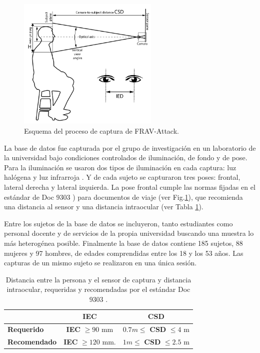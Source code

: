 \begin{figure}[ht]
     \centering
     \includegraphics[width=0.6\textwidth]{ch-sistemasABC/images/ch-BBDDs/CAPTURA_ESTATICA.png}
     \caption{Esquema del proceso de captura de \Gls{FRAV-Attack}.}
     \label{fig:EsquemaCapturaFRAVAttack}
\end{figure}

La base de datos fue capturada por el grupo de investigación  en un laboratorio de la universidad  bajo condiciones controlados de iluminación, de fondo y de pose. Para la iluminación se usaron dos tipos de iluminación en cada captura: luz halógena y luz infrarroja . Y de cada sujeto se capturaron tres poses: frontal, lateral derecha y lateral izquierda. La pose frontal cumple las normas fijadas en el estándar de  Doc $9303$ \cite{doc20069303}) para documentos de viaje (ver Fig.\ref{fig:EsquemaCapturaFRAVAttack}), que recomienda una distancia al sensor  y una distancia intraocular  (ver Tabla \ref{tab:distanciasICAO}).   

Entre los sujetos de la base de datos se incluyeron, tanto estudiantes como personal docente y de servicios de la propia universidad buscando una muestra lo más heterogénea posible. Finalmente la base de datos contiene 185 sujetos, 88 mujeres y 97 hombres, de edades comprendidas entre los 18 y los 53 años. Las capturas de un mismo sujeto se realizaron en una única sesión.

\begin{table}[t!]
    \centering
    \begin{tabular}{|l|c|c|} \hline
    \multicolumn{1}{|p{2cm}|}{} & \multicolumn{1}{|p{4cm}|}{\centering\textbf{IEC}} & \multicolumn{1}{|p{5cm}|}{\centering\textbf{CSD}} \\ \hline 
    \small{\textbf{Requerido}} & \textbf{IEC} $\geq 90$ mm  & $0.7 m\leq $ \textbf{CSD} $\leq 4$ m\\ \hline  \small{\textbf{Recomendado}} & \textbf{IEC} $\geq 120$ mm. & $1 m\leq $ \textbf{CSD} $\leq 2.5$ m\\ \hline 
    \end{tabular}
    \caption{ Distancia entre la persona y el sensor de captura y  distancia intraocular,  requeridas y recomendadas por el estándar  Doc $9303$ \cite{doc20069303}.}
    \label{tab:distanciasICAO}
\end{table}

